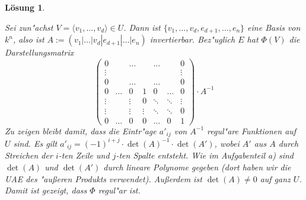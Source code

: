 \documentclass[a4paper, 12pt, numbers=noendperiod, chapterprefix=true, headsepline]{scrbook}
\theoremstyle{break}
\newtheorem{Loes}{L\"osung}
\theoremstyle{nonumberbreak}
\theoremstyle{nonumberplain}
\begin{document}
\begin{Loes}
\begin{enumerate}[a)]
	Sei zun"achst $V = \langle v_1, \dots, v_d \rangle \in U$. Dann ist $\{v_1, \dots, v_d, e_{d+1}, \dots, e_n\}$ eine Basis von $k^n$, also ist $A := (v_1 | \dots |v_d|e_{d+1}|\dots|e_n)$ invertierbar. Bez"uglich $E$ hat $\Phi(V)$ die Darstellungsmatrix 
		\[\begin{pmatrix}
			0& &\dots && \dots && 0 \\
			\vdots &&&&&& \vdots \\
			0 && \dots && \dots && 0 \\
			0 & \dots & 0 & 1 & 0 &\dots &0\\
			\vdots & & \vdots & 0 &\ddots& \ddots & \vdots\\
			\vdots & & \vdots & \vdots & \ddots&\ddots&0 \\
			0 & \dots &0 & 0 &\dots &0& 1
			\end{pmatrix}
			\cdot A^{-1}
		\]
	Zu zeigen bleibt damit, dass die Eintr"age $a'_{ij}$ von $A^{-1}$ regul"are Funktionen auf $U$ sind. Es gilt $a'_{ij} = (-1)^{i+j} \cdot \det(A)^{-1} \cdot \det(A')$, wobei $A'$ aus $A$ durch Streichen der $i$-ten Zeile und $j$-ten Spalte entsteht. Wie im Aufgabenteil a) sind $\det(A)$ und $\det(A')$ durch lineare Polynome gegeben (dort haben wir die UAE des "au\ss eren Produkts verwendet). Au\ss erdem ist $\det(A)\neq 0$ auf ganz $U$. Damit ist gezeigt, dass $\Phi$ regul"ar ist.


\end{enumerate}
\end{Loes}
\end{document}
